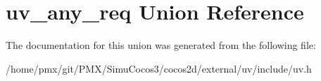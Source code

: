 \hypertarget{unionuv__any__req}{}\section{uv\+\_\+any\+\_\+req Union Reference}
\label{unionuv__any__req}


The documentation for this union was generated from the following file\+:\begin{DoxyCompactItemize}
\item 
/home/pmx/git/\+P\+M\+X/\+Simu\+Cocos3/cocos2d/external/uv/include/uv.\+h\end{DoxyCompactItemize}

